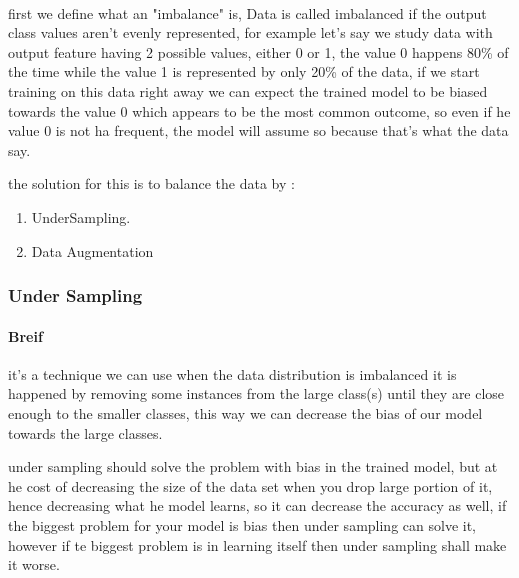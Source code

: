 \paragraph{}
first we define what an "imbalance" is, Data is called imbalanced if the output class values aren't evenly represented, for example let's say we study data with output feature having 2 possible values, either 0 or 1, the value 0 happens 80\% of the time while the value 1 is represented by only 20\% of the data, if we start training on this data right away we can expect the trained model to be biased towards the value 0 which appears to be the most common outcome, so even if he value 0 is not ha frequent, the model will assume so because that's what the data say. \newline

the solution for this is to balance the data by :
\begin{enumerate}
	\item UnderSampling.
	\item Data Augmentation
\end{enumerate}
\subsubsection{Under Sampling}
\paragraph{Breif}
it's a technique we can use when the data distribution is imbalanced it is happened by removing some instances from the large class(s) until they are close enough to the smaller classes, this way we can decrease the bias of our model towards the large classes.\newline 

under sampling should solve the problem with bias in the trained model, but at he cost of decreasing the size of the data set when you drop large portion of it, hence decreasing what he model learns, so it can decrease the accuracy as well, if the biggest problem for your model is bias then under sampling can solve it, however if te biggest problem is in learning itself then under sampling shall make it worse.

